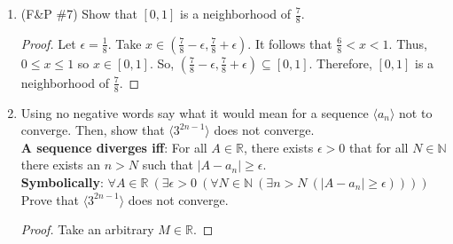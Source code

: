 \documentclass{article}
\theoremstyle{problem}
\theoremstyle{plain}
\theoremstyle{remark}
\newcommand{\abs}[1] {
  \left| #1 \right|
}
\begin{document}
\begin{enumerate}
\item (F\&P \#7) Show that $[0,1]$ is a neighborhood of $\frac{7}{8}$.
  \begin{proof}
    Let $\epsilon = \frac{1}{8}$. 
    Take $x \in (\frac{7}{8} - \epsilon, \frac{7}{8} + \epsilon)$.
    It follows that $ \frac{6}{8} < x < 1$. 
    Thus, $0 \leq x \leq 1$ so $x \in [0,1]$.
    So, $(\frac{7}{8} - \epsilon, \frac{7}{8} + \epsilon) \subseteq [0,1]$.
    Therefore, $[0,1]$ is a neighborhood of $\frac{7}{8}$.
  \end{proof}
\item Using no negative words say what it would mean for a sequence $\langle a_n \rangle$ not to converge. Then, show that $\langle 3^{2n-1} \rangle$ does not converge.\\
 \textbf{A sequence diverges iff}:
 For all $A \in \mathbb R$, there exists $\epsilon > 0$ that for all $N \in \mathbb N$ there exists an $n > N$ such that $\abs{A - a_n} \geq \epsilon$.\\
 \textbf{Symbolically}: $\forall A \in \mathbb R\ (\exists \epsilon > 0\ (\forall N \in \mathbb N\ (\exists n > N\ ( \abs{A - a_n} \geq \epsilon))))$\\
 Prove that $\langle 3^{2n-1} \rangle$ does not converge.
 \begin{proof}
   Take an arbitrary $M \in \mathbb R$.
   
 \end{proof}
 






\end{enumerate}
\end{document}
